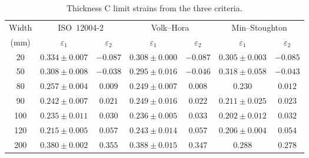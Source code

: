 \begin{table}[H]
    \centering
    \small
    \begin{tabular}{c c c c c c c}
        \toprule
        Width & \multicolumn{2}{c}{ISO~12004-2} & \multicolumn{2}{c}{Volk--Hora} & \multicolumn{2}{c}{Min--Stoughton} \\
        \cmidrule(lr){2-3}\cmidrule(lr){4-5}\cmidrule(lr){6-7}
        (\si{\milli\meter}) & $\varepsilon_1$ & $\varepsilon_2$ & $\varepsilon_1$ & $\varepsilon_2$ & $\varepsilon_1$ & $\varepsilon_2$ \\
        \midrule
        20  & $0.334 \pm 0.007$ & $-0.087$ & $0.308 \pm 0.000$ & $-0.087$ & $0.305 \pm 0.003$ & $-0.085$ \\
        50  & $0.308 \pm 0.008$ & $-0.038$ & $0.295 \pm 0.016$ & $-0.046$ & $0.318 \pm 0.058$ & $-0.043$ \\
        80  & $0.257 \pm 0.004$ & $0.009$  & $0.249 \pm 0.007$ & $0.008$  & $0.230$           & $0.012$ \\
        90  & $0.242 \pm 0.007$ & $0.021$  & $0.249 \pm 0.016$ & $0.022$  & $0.211 \pm 0.025$ & $0.023$ \\
        100 & $0.235 \pm 0.011$ & $0.030$  & $0.236 \pm 0.005$ & $0.033$  & $0.202 \pm 0.012$ & $0.032$ \\
        120 & $0.215 \pm 0.005$ & $0.057$  & $0.243 \pm 0.014$ & $0.057$  & $0.206 \pm 0.004$ & $0.054$ \\
        200 & $0.380 \pm 0.002$ & $0.355$  & $0.388 \pm 0.015$ & $0.347$  & $0.288$           & $0.278$ \\
        \bottomrule
    \end{tabular}
    \caption[Min--Stoughton campaign comparison, thickness~C]{Thickness C limit strains from the three criteria.}
    \label{tab:ms_campaign_C}
\end{table}


